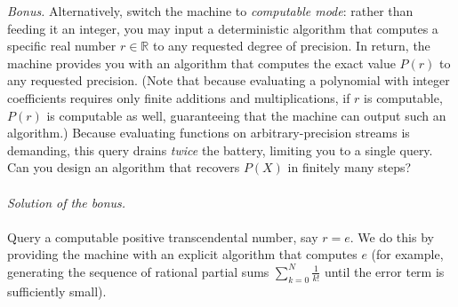 \begin{solution}
\begin{remark}
    \end{remark}
    \noindent\textit{Bonus.}
    Alternatively, switch the machine to \emph{computable mode}: rather than feeding it an integer, you may input a deterministic algorithm that computes a specific real number \( r\in\mathbb{R} \) to any requested degree of precision. In return, the machine provides you with an algorithm that computes the exact value \( P\left(r\right) \) to any requested precision. (Note that because evaluating a polynomial with integer coefficients requires only finite additions and multiplications, if \( r \) is computable, \( P\left(r\right) \) is computable as well, guaranteeing that the machine can output such an algorithm.) Because evaluating functions on arbitrary-precision streams is demanding, this query drains \emph{twice} the battery, limiting you to a single query. Can you design an algorithm that recovers \( P\left(X\right) \) in finitely many steps?
    \\\\
    \textit{Solution of the bonus.}
    \\\\
    Query a computable positive transcendental number, say \( r=e \). We do this by providing the machine with an explicit algorithm that computes \( e \) (for example, generating the sequence of rational partial sums \( \sum_{k=0}^{N} \frac{1}{k!} \) until the error term is sufficiently small).


\end{solution}
